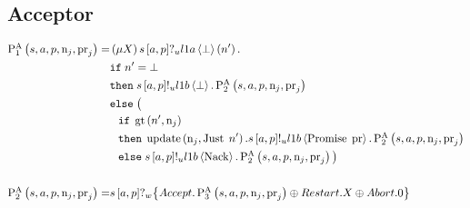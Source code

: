 \subsection{Acceptor}
\begin{align*}
\textstyle\operatorname{P^{A}_{1}}\left(
    s,
    a,
    p,
    \operatorname{n}_{j},
    \operatorname{pr}_{j}
\right) =
&
    \left(\mu X\right)
    s\left[a, p\right]?_u l1a \left\langle \bot \right\rangle \left(n'\right).
    \\
&
    \mathtt{if}\; n' = \bot
    \\
&
    \mathtt{then}\;
        s\left[a, p\right]!_u l1b \left\langle \bot \right\rangle.
        \textstyle\operatorname{P^{A}_{2}}\left(
            s,
            a,
            p,
            \operatorname{n}_{j},
            \operatorname{pr}_{j}
        \right)
    \\
&
    \mathtt{else}\; \big(\\
&\hspace*{0.75em * 1}
    \mathtt{if}\; \operatorname{gt}\left(n', \operatorname{n}_{j}\right)
    \\
&\hspace*{0.75em * 1}
    \mathtt{then}\;
        \operatorname{update} \left(\operatorname{n}_{j}, \operatorname{Just}\; n'\right).
        s\left[a, p\right]!_u l1b \left\langle \operatorname{Promise}\; \operatorname{pr} \right\rangle.
        \textstyle\operatorname{P^{A}_{2}}\left(
            s,
            a,
            p,
            \operatorname{n}_{j},
            \operatorname{pr}_{j}
        \right)
        \\
&\hspace*{0.75em * 1}
    \mathtt{else}\;
        s\left[a, p\right]!_u l1b \left\langle \operatorname{Nack} \right\rangle.
        \textstyle\operatorname{P^{A}_{2}}\left(
            s,
            a,
            p,
            \operatorname{n}_{j},
            \operatorname{pr}_{j}
        \right)
\big )
\\\\
\textstyle\operatorname{P^{A}_{2}}\left(
    s,
    a,
    p,
    \operatorname{n}_{j},
    \operatorname{pr}_{j}
\right) =&
    s\left[a, p\right]?_w \big\{
    \mathnormal{Accept}.
        \textstyle\operatorname{P^{A}_{3}}\left(
            s,
            a,
            p,
            \operatorname{n}_{j},
            \operatorname{pr}_{j}
        \right)
    \oplus \mathnormal{Restart}.X
    \oplus \mathnormal{Abort}.0
\big\}
\end{align*}


